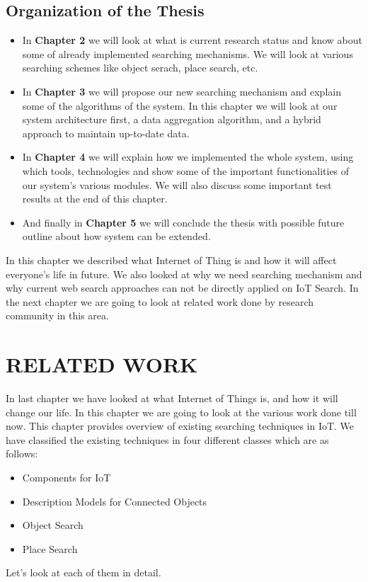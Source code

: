 \documentclass [a4paper,12pt]{book}
\begin{document}
\section{Organization of the Thesis}
\begin{itemize}
\item In \textbf{Chapter 2} we will look at what is current research status and know about some of already implemented searching mechanisms. We will look at various searching schemes like object serach, place search, etc.
\item In \textbf{Chapter 3} we will propose our new searching mechanism and explain some of the algorithms of the system. In this chapter we will look at our system architecture first, a data aggregation algorithm, and a hybrid approach to maintain up-to-date data.
\item In \textbf{Chapter 4} we will explain how we implemented the whole system, using which tools, technologies and show some of the important functionalities of our system's various modules. We will also discuss some important test results at the end of this chapter.
\item And finally in \textbf{Chapter 5} we will conclude the thesis with possible future outline about how system can be extended.
\end{itemize}
In this chapter we described what Internet of Thing is and how it will affect everyone's life in future. We also looked at why we need searching mechanism and why current web search approaches can not be directly applied on IoT Search. In the next chapter we are going to look at related work done by research community in this area.

\newpage
\chapter{RELATED WORK}
\vspace{0.2cm}

In last chapter we have looked at what Internet of Things is, and how it will change our life. In this chapter we are going to look at the various work done till now. This chapter provides overview of existing searching techniques in IoT. We have classified the existing techniques in four different classes which are as follows:

\begin{itemize}
\item Components for IoT
\item Description Models for Connected Objects
\item Object Search
\item Place Search
\end{itemize}
Let's look at each of them in detail.
\end{document}
